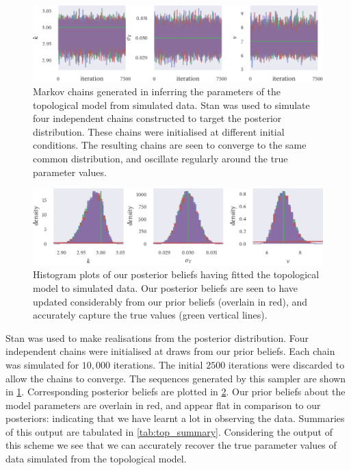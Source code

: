 \begin{figure}[tbp]
  \includegraphics{top_trace.pdf}
  \caption{Markov chains generated in inferring the parameters of the
    topological model from simulated data. Stan was used to simulate four
    independent chains constructed to target the posterior distribution.
    These chains were initialised at different initial conditions. The
    resulting chains are seen to converge to the same common distribution, and
    oscillate regularly around the true parameter values.}
  \label{fig:top_trace}
\end{figure}
\begin{figure}[tbp]
  \includegraphics{top_hist.pdf}
  \caption{Histogram plots of our posterior beliefs having fitted the
    topological model to simulated data. Our posterior beliefs are seen to have
    updated considerably from our prior beliefs (overlain in red), and accurately
    capture the true values (green vertical lines).}
  \label{fig:top_hist}
\end{figure}

Stan was used to make realisations from the posterior distribution. Four
independent chains were initialised at draws from our prior beliefs. Each chain
was simulated for $10,000$ iterations. The initial $2500$ iterations were
discarded to allow the chains to converge. The sequences generated by this
sampler are shown in \cref{fig:top_trace}. Corresponding posterior beliefs are
plotted in \cref{fig:top_hist}. Our prior beliefs about the model parameters
are overlain in red, and appear flat in comparison to our posteriors:
indicating that we have learnt a lot in observing the data. Summaries of this
output are tabulated in \cref{tab:top_summary}. Considering the output of this
scheme we see that we can accurately recover the true parameter values of data
simulated from the topological model.

